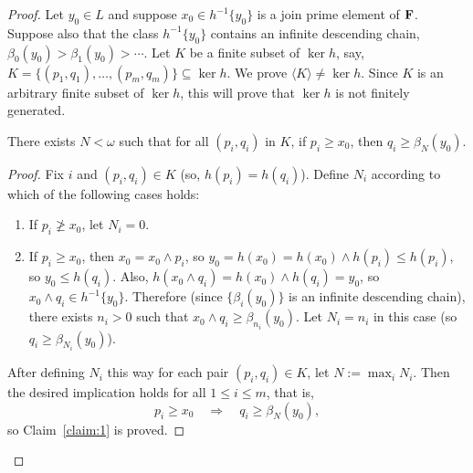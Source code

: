 \begin{proof} Let $y_0\in L$ and suppose 
  $x_0 \in h^{-1}\{y_0\}$ is a join prime element of $\mathbf{F}$. 
  Suppose also that the class $h^{-1}\{y_0\}$ contains an 
  infinite descending chain, $\beta_0(y_0) > \beta_1(y_0) > \cdots$.
  Let $K$ be a finite subset of $\ker h$, say, 
  $K = \{(p_1, q_1), \dots, (p_{m}, q_{m})\} \subseteq \ker h$.
  We prove $\langle K \rangle \neq \ker h$. 
  Since $K$ is an arbitrary finite subset of $\ker h$, this will prove 
  that $\ker h$ is not finitely generated.

\begin{claim}
  \label{claim:1}
There exists $N<\omega$ such that for all $(p_i, q_i)$ in $K$, if $p_i \geqslant x_0$, then $q_i \geqslant \beta_N (y_0)$.
\end{claim}
\begin{proof}
Fix $i$ and $(p_i, q_i) \in K$ (so, $h(p_i) = h(q_i)$). Define $N_i$ according 
to which of the following cases holds:
\begin{enumerate}
\item If $p_i \ngeqslant x_0$, let $N_i = 0$.  
\item If $p_i\geqslant x_0$, then $x_0 = x_0\wedge p_i$, so 
$y_0 = h(x_0) = h(x_0) \wedge h(p_i) \leqslant h(p_i)$, so $y_0\leqslant h(q_i)$. 
Also, $h(x_0 \wedge q_i) = h(x_0) \wedge h(q_i) = y_0$, so $x_0\wedge q_i \in h^{-1}\{y_0\}$. 
Therefore (since $\{\beta_i(y_0)\}$ is an infinite descending chain),
there exists $n_i>0$ such that $x_0 \wedge q_i \geqslant\beta_{n_i}(y_0)$. 
Let $N_i = n_i$ in this case (so $q_i \geqslant \beta_{N_i}(y_0)$).
\end{enumerate}
After defining $N_i$ this way for each pair $(p_i,q_i)\in K$, 
let $N := \max_i N_i$. %
Then the desired implication holds for all $1\leqslant i \leqslant m$, that is,
\begin{equation}
\label{eq:star3}    
p_i \geqslant x_0 \quad \Longrightarrow \quad q_i \geqslant \beta_N(y_0),
\end{equation}
so Claim~\ref{claim:1} is proved.
\end{proof}


\end{proof}
